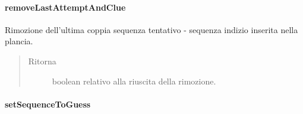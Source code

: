 \documentclass[letterpaper,10pt,italian,openany,oneside]{sphinxmanual}
\begin{document}
\paragraph{removeLastAttemptAndClue}
\label{\detokenize{source/it/unicam/cs/pa/mastermind/gamecore/BoardModel:removelastattemptandclue}}

\begin{fulllineitems}
\label{\detokenize{source/it/unicam/cs/pa/mastermind/gamecore/BoardModel:it.unicam.cs.pa.mastermind.gamecore.BoardModel.removeLastAttemptAndClue()}}
Rimozione dell’ultima coppia sequenza tentativo - sequenza indizio inserita nella plancia.
\begin{quote}\begin{description}
\item[{Ritorna}] \leavevmode
boolean relativo alla riuscita della rimozione.

\end{description}\end{quote}

\end{fulllineitems}



\paragraph{setSequenceToGuess}
\label{\detokenize{source/it/unicam/cs/pa/mastermind/gamecore/BoardModel:setsequencetoguess}}
\end{document}
